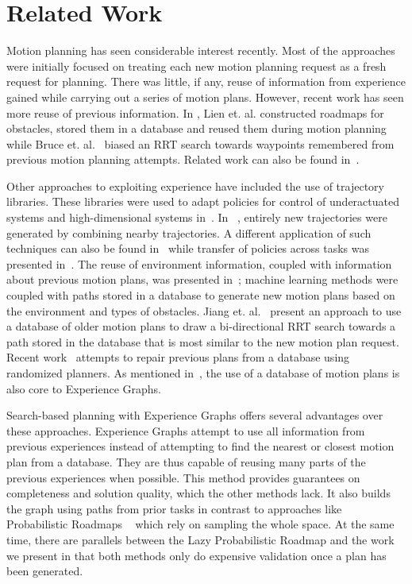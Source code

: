 \documentclass[letterpaper, 10 pt, conference]{ieeeconf}  %
\begin{document}
\section{Related Work}
Motion planning has seen considerable interest recently. Most of the
approaches were initially focused on treating each new motion planning request as
a fresh request for planning. There was little, if any, reuse of information
from experience gained while carrying out a series of motion plans. However,
recent work has seen more reuse of previous information. In \cite{Lien:2005},
Lien et.  al. constructed roadmaps for obstacles, stored them in a database and
reused them during motion planning while Bruce et. al.~\cite{Bruce:2002} biased
an RRT search towards waypoints remembered from previous motion planning
attempts. Related work can also be found in~\cite{Zucker:2007,Ferguson:2006}.

Other approaches to exploiting experience have included the use of trajectory
libraries. These libraries were used to adapt policies for control of
underactuated systems and high-dimensional systems in~\cite{Stolle:2006}. In~
\cite{Atkeson:2003}, entirely new trajectories were generated by combining
nearby trajectories. A different application of such techniques can also be
found in~\cite{Liu:2009} while transfer of policies across tasks was presented
in~\cite{Stolle:2007}. The reuse of environment information, coupled with
information about previous motion plans, was presented in~\cite{Jetchev:2010};
machine learning methods were coupled with paths stored in a database to
generate new motion plans based on the environment and types of obstacles. Jiang
et. al.~\cite{Jiang:2007} present an approach to use a database of older
motion plans to draw a bi-directional RRT search towards a path stored in the
database that is most similar to the new motion plan request.  Recent
work~\cite{Berenson:2012} attempts to repair previous plans from a database
using randomized planners. As mentioned in~\cite{PhillipsRSS:2012}, the use of a
database of motion plans is also core to Experience Graphs. 

Search-based planning with Experience Graphs offers several advantages over
these approaches. Experience Graphs attempt to use all information from
previous experiences instead of attempting to find the nearest or closest motion
plan from a database. They are thus capable of reusing many parts of the previous
experiences when possible. This method provides guarantees on completeness and
solution quality, which the other methods lack.
It also builds the graph using paths from prior tasks in contrast
to approaches like Probabilistic Roadmaps ~\cite{Kavraki:1996} which rely on
sampling the whole space. At the same time, there are parallels between the Lazy
Probabilistic Roadmap \cite{bohlin2000path} and the work we present in that both
methods only do expensive validation once a plan has been generated.
\end{document}
